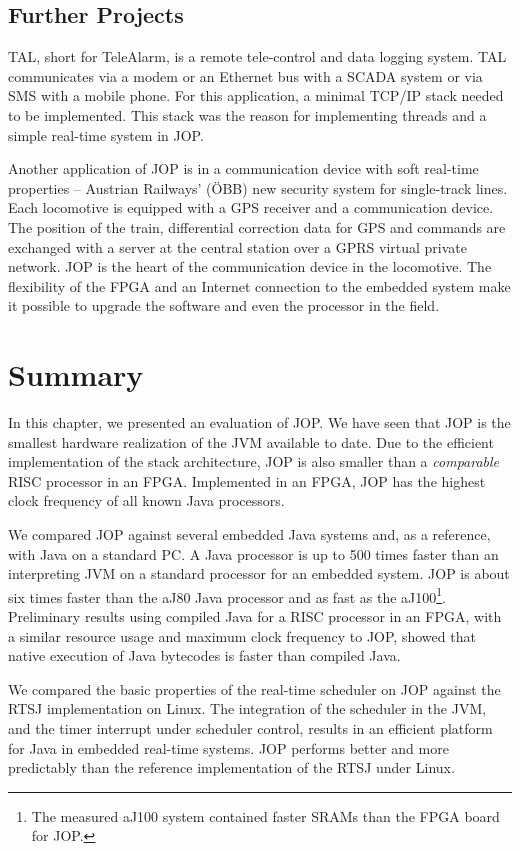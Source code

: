 \subsection{Further Projects}

TAL, short for TeleAlarm, is a remote tele-control and data logging
system. TAL communicates via a modem or an Ethernet bus with a SCADA
system or via SMS with a mobile phone. For this application, a
minimal TCP/IP stack needed to be implemented. This stack was the
reason for implementing threads and a simple real-time system in
JOP.

Another application of JOP is in a communication device with soft
real-time properties -- Austrian Railways' (\"OBB) new security
system for single-track lines. Each locomotive is equipped with a
GPS receiver and a communication device. The position of the train,
differential correction data for GPS and commands are exchanged with
a server at the central station over a GPRS virtual private network.
JOP is the heart of the communication device in the locomotive. The
flexibility of the FPGA and an Internet connection to the embedded
system make it possible to upgrade the software and even the
processor in the field.


\section{Summary}

In this chapter, we presented an evaluation of JOP. We have seen
that JOP is the smallest hardware realization of the JVM available
to date. Due to the efficient implementation of the stack
architecture, JOP is also smaller than a \emph{comparable} RISC
processor in an FPGA. Implemented in an FPGA, JOP has the highest
clock frequency of all known Java processors.

We compared JOP against several embedded Java systems and, as a
reference, with Java on a standard PC. A Java processor is up to 500
times faster than an interpreting JVM on a standard processor for an
embedded system. JOP is about six times faster than the aJ80 Java
processor and as fast as the aJ100\footnote{The measured aJ100
system contained faster SRAMs than the FPGA board for JOP.}.
Preliminary results using compiled Java for a RISC processor in an
FPGA, with a similar resource usage and maximum clock frequency to
JOP, showed that native execution of Java bytecodes is faster than
compiled Java.

We compared the basic properties of the real-time scheduler on JOP
against the RTSJ implementation on Linux. The integration of the
scheduler in the JVM, and the timer interrupt under scheduler
control, results in an efficient platform for Java in embedded
real-time systems. JOP performs better and more predictably than the
reference implementation of the RTSJ under Linux.

